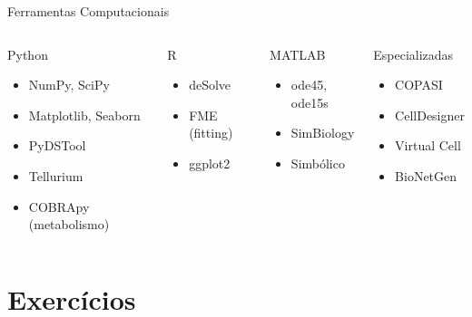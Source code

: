 \begin{frame}{Ferramentas Computacionais}
\begin{columns}
\begin{block}{Python}
\begin{itemize}
    \item NumPy, SciPy
    \item Matplotlib, Seaborn
    \item PyDSTool
    \item Tellurium
    \item COBRApy (metabolismo)
\end{itemize}
\end{block}

\begin{block}{R}
\begin{itemize}
    \item deSolve
    \item FME (fitting)
    \item ggplot2
\end{itemize}
\end{block}

\begin{block}{MATLAB}
\begin{itemize}
    \item ode45, ode15s
    \item SimBiology
    \item Simbólico
\end{itemize}
\end{block}

\begin{block}{Especializadas}
\begin{itemize}
    \item COPASI
    \item CellDesigner
    \item Virtual Cell
    \item BioNetGen
\end{itemize}
\end{block}
\end{columns}
\end{frame}

\section{Exercícios}

